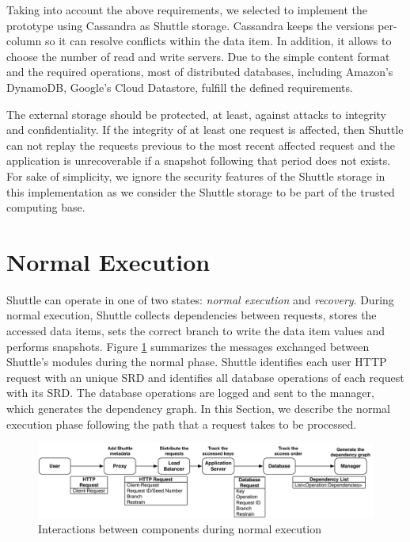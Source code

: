 Taking into account the above requirements, we selected to implement the prototype using Cassandra \cite{Lakshman2010a} as Shuttle storage. Cassandra keeps the versions per-column so it can resolve conflicts within the data item. In addition, it allows to choose the number of read and write servers. Due to the simple content format and the required operations, most of distributed databases, including Amazon's DynamoDB, Google's Cloud Datastore, fulfill the defined requirements.

The external storage should be protected, at least, against attacks to integrity and confidentiality. If the integrity of at least one request is affected, then Shuttle can not replay the requests previous to the most recent affected request and the application is unrecoverable if a snapshot following that period does not exists. For sake of simplicity, we ignore the security features of the Shuttle storage in this implementation as we consider the Shuttle storage to be part of the trusted computing base.








\section{Normal Execution}\label{sec:impl:normal}

Shuttle can operate in one of two states: \textit{normal execution} and \textit{recovery}. During normal execution, Shuttle collects  dependencies between requests, stores the accessed data items, sets the correct branch to write the data item values and performs snapshots. Figure \ref{fig:normal:mensaging} summarizes the messages exchanged between Shuttle's modules during the normal phase. Shuttle identifies each user \ac{HTTP} request with an unique \ac{SRD} and identifies all database operations of each request with its \ac{SRD}. The database operations are logged and sent to the manager, which generates the dependency graph. 
In this Section, we describe the normal execution phase following the path that a request takes to be processed.

\begin{figure}
  \centering
  \includegraphics[width=\textwidth]{images/message_normal}
  \caption{Interactions between components during normal execution}
  \label{fig:normal:mensaging}
\end{figure}



